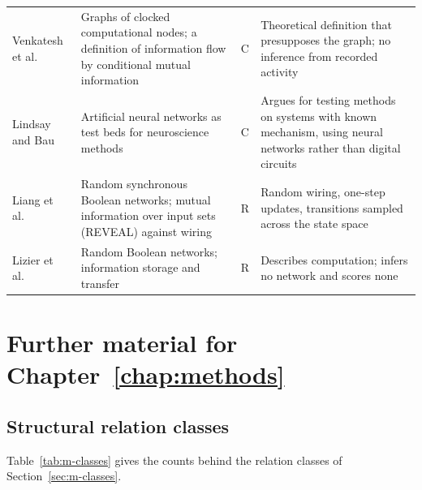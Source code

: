\begin{table}[tbp]
\begin{tabular}{@{}L{0.2\textwidth}L{0.24\textwidth}L{0.055\textwidth}L{0.435\textwidth}@{}}
Venkatesh et al.~\cite{venkatesh2020flow} & Graphs of clocked computational nodes; a definition of information flow by conditional mutual information & C & Theoretical definition that presupposes the graph; no inference from recorded activity \\
Lindsay and Bau~\cite{lindsay2023testing} & Artificial neural networks as test beds for neuroscience methods & C & Argues for testing methods on systems with known mechanism, using neural networks rather than digital circuits \\
Liang et al.~\cite{liang1998reveal} & Random synchronous Boolean networks; mutual information over input sets (REVEAL) against wiring & R & Random wiring, one-step updates, transitions sampled across the state space \\
Lizier et al.~\cite{lizier2011smallworld} & Random Boolean networks; information storage and transfer & R & Describes computation; infers no network and scores none \\
\bottomrule
\end{tabular}
\end{table}

\section{Further material for Chapter~\ref{chap:methods}}

\subsection{Structural relation classes}

Table~\ref{tab:m-classes} gives the counts behind the relation classes of Section~\ref{sec:m-classes}.


